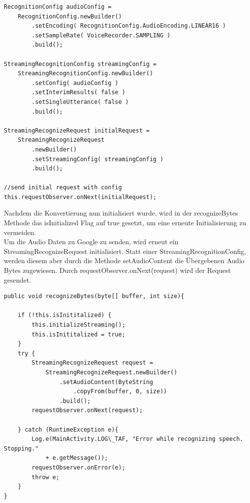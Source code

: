 \begin{lstlisting}
RecognitionConfig audioConfig =
	RecognitionConfig.newBuilder()
		.setEncoding( RecognitionConfig.AudioEncoding.LINEAR16 )
		.setSampleRate( VoiceRecorder.SAMPLING )
		.build();

StreamingRecognitionConfig streamingConfig =
	StreamingRecognitionConfig.newBuilder()
		.setConfig( audioConfig )
		.setInterimResults( false )
		.setSingleUtterance( false )
		.build();

StreamingRecognizeRequest initialRequest =
	StreamingRecognizeRequest
		.newBuilder()
		.setStreamingConfig( streamingConfig )
		.build();
		
//send initial request with config
this.requestObserver.onNext(initialRequest);

\end{lstlisting}
Nachdem die Konvertierung nun initialisiert wurde, wird in der recognizeBytes Methode das isInitialized Flag auf true gesetzt, um eine erneute Initialisierung zu vermeiden.\\
Um die Audio Daten zu Google zu senden, wird erneut ein StreamingRecognizeRequest initialisiert. Statt einer StreamingRecognitionConfig, werden diesem aber durch die Methode setAudioContent die Übergebenen Audio Bytes zugewiesen. Durch requestObserver.onNext(request) wird der Request gesendet.

\begin{lstlisting}
public void recognizeBytes(byte[] buffer, int size){

	if (!this.isInititalized) {
		this.initializeStreaming();
		this.isInititalized = true;
	}
	try {
		StreamingRecognizeRequest request =
			StreamingRecognizeRequest.newBuilder()
				.setAudioContent(ByteString
					.copyFrom(buffer, 0, size))
				.build();
		requestObserver.onNext(request);
		
	} catch (RuntimeException e){
		Log.e(MainActivity.LOG\_TAF, "Error while recognizing speech. Stopping."
			+ e.getMessage());
		requestObserver.onError(e);
		throw e;
	}
}

\end{lstlisting}

